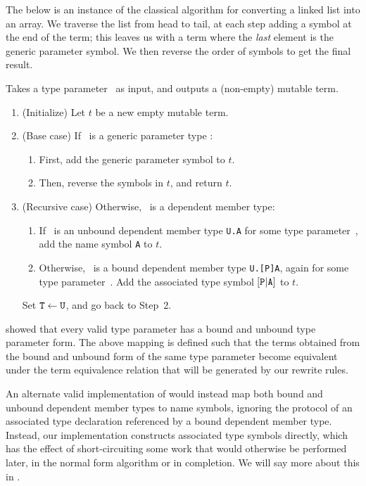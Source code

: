 \documentclass[../generics]{subfiles}
\begin{document}
The below is an instance of the classical algorithm for converting a linked list into an array. We traverse the list from head to tail, at each step adding a symbol at the end of the term; this leaves us with a term where the \emph{last} element is the generic parameter symbol. We then reverse the order of symbols to get the final result.

\begin{algorithm}\label{build term generic}
Takes a type parameter \tT\ as input, and outputs a (non-empty) mutable term.
\begin{enumerate}
\item (Initialize) Let $t$ be a new empty mutable term.
\item (Base case) If \tT\ is a generic parameter type :
\begin{enumerate}
\item First, add the generic parameter symbol  to $t$.
\item Then, reverse the symbols in $t$, and return $t$.
\end{enumerate}
\item (Recursive case) Otherwise, \tT\ is a dependent member type:
\begin{enumerate}
\item If \tT\ is an unbound dependent member type \verb|U.A| for some type parameter~\tU, add the name symbol \texttt{A} to $t$.
\item Otherwise, \tT\ is a bound dependent member type \verb|U.[P]A|, again for some type parameter~\tU. Add the associated type symbol $[\texttt{P}|\texttt{A}]$ to $t$.
\end{enumerate}
Set $\texttt{T} \leftarrow \texttt{U}$, and go back to Step~2.
\end{enumerate}
\end{algorithm}

 showed that every valid type parameter has a bound and unbound type parameter form. The above mapping is defined such that the terms obtained from the bound and unbound form of the same type parameter become equivalent under the term equivalence relation that will be generated by our rewrite rules.

An alternate valid implementation of  would instead map both bound and unbound dependent member types to name symbols, ignoring the protocol of an associated type declaration referenced by a bound dependent member type. Instead, our implementation constructs associated type symbols directly, which has the effect of short-circuiting some work that would otherwise be performed later, in the normal form algorithm or in completion. We will say more about this in .
\end{document}
